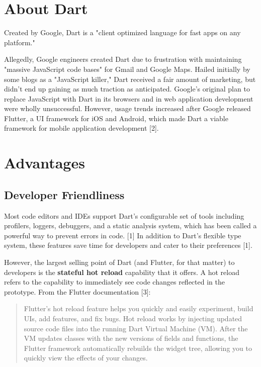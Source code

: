 \section{About Dart}
Created by Google, Dart is a "client optimized language for fast apps on any platform." 

Allegedly, Google engineers created Dart due to frustration with maintaining "massive JavaScript code bases" for Gmail and Google Maps. 
Hailed initially by some blogs as a "JavaScript killer," Dart received a fair amount of marketing, but didn't end up gaining as much traction as anticipated. Google's
original plan to replace JavaScript with Dart in its browsers and in web application development were wholly unsuccessful.
However, usage trends increased after Google released Flutter, a UI framework for iOS and Android, which made Dart a viable framework 
for mobile application development [2]. 

\section{Advantages}

\subsection{Developer Friendliness}

Most code editors and IDEs support Dart's configurable set of tools including profilers, loggers, debuggers, and a static analysis system, 
which has been called a powerful way to prevent errors in code. [1] In addition to Dart's flexible type system, these features save time for developers 
and cater to their preferences [1].

However, the largest selling point of Dart (and Flutter, for that matter) to developers is the \textbf{stateful hot reload} capability that it offers. 
A hot reload refers to the capability to immediately see code changes reflected in the prototype. From the Flutter documentation [3]: 

\begin{quote}
Flutter’s hot reload feature helps you quickly and easily experiment, build UIs, add features, and fix bugs.
Hot reload works by injecting updated source code files into the running Dart Virtual Machine (VM). 
After the VM updates classes with the new versions of fields and functions, the Flutter framework automatically rebuilds the widget tree, allowing you to quickly view the effects of your changes.
\end{quote}

